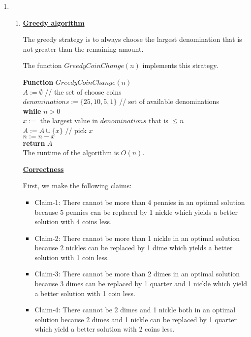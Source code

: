 \documentclass[11pt]{article}
\begin{document}
\begin{enumerate}
\begin{enumerate}
\end{enumerate}

\item %
\begin{enumerate}
\item \underline{\textbf{Greedy algorithm}}

The greedy strategy is to always choose the largest denomination that
is not greater than the remaining amount.

The function $GreedyCoinChange(n)$ implements this strategy.

\textbf{Function} $GreedyCoinChange(n)$\\
\-\hspace{3em} $A := \emptyset$ // the set of choose coins \\
\-\hspace{3em} $denominations := \{25,10,5,1\}$ // set of
available denominations \\
\-\hspace{3em} \textbf{while} $n > 0$\\
\-\hspace{5em} $x := $ the largest value in $denominations$ that is
$\leq n$ \\
\-\hspace{5em} $A := A \cup \{x\}$ // pick $x$\\
\-\hspace{5em} $n := n - x$\\
\-\hspace{3em} \textbf{return} $A$\\

The runtime of the algorithm is $O(n)$.

\underline{\textbf{Correctness}}

First, we make the following claims:
\begin{itemize}
\item Claim-1: There cannot be more than 4 pennies in an optimal
  solution because 5 pennies can be replaced by 1 nickle which yields
  a better solution with 4 coins less.
\item Claim-2: There cannot be more than 1 nickle in an optimal
  solution because 2 nickles can be replaced by 1 dime which yields
  a better solution with 1 coin less.
\item Claim-3: There cannot be more than 2 dimes in an optimal
  solution because 3 dimes can be replaced by 1 quarter and 1 nickle
  which yield a better solution with 1 coin less.
\item Claim-4: There cannot be 2 dimes and 1 nickle both in an optimal
  solution because 2 dimes and 1 nickle can be replaced by 1 quarter
  which yield a better solution with 2 coins less.
\end{itemize}


\end{enumerate}
\end{enumerate}
\end{document}
